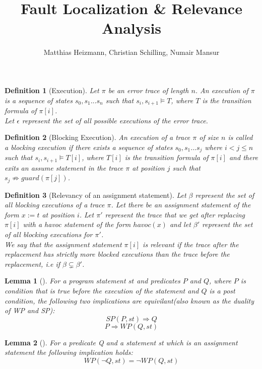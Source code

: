 \documentclass{article}
\title{Fault Localization \& Relevance Analysis \\ }
\author{Matthias Heizmann, Christian Schilling, Numair Mansur}
\newcommand{\limp}{\Rightarrow}
\newtheorem{mydef}{Definition}
\newtheorem{lemma}{Lemma}
\begin{document}
\maketitle
\begin{mydef}[Execution]\label{mydef:execution}
Let $\pi$ be an error trace of length $n$. An execution of $\pi$ is a sequence of states $s_0, s_1...s_n$ such that $s_i, s_{i+1} \models T$, where $T$ is the transition formula of $\pi[i]$. \\
Let $\epsilon$ represent the set of all possible executions of the error trace.
\end{mydef}

\begin{mydef}[Blocking Execution]\label{mydef:blockingexecution}
An execution of a trace $\pi$ of size $n$ is called a blocking execution if there exists a sequence of states $s_0, s_1...s_j$ where $i<j \leq n$ such that $s_i, s_{i+1} \models T[i]$, where $T[i]$ is the transition formula of $\pi[i]$ and there exits an assume statement in the trace $\pi$ at position $j$ such that $s_{j} \not \limp guard(\pi[j])$.
\end{mydef}

\begin{mydef}[Relevancy of an assignment statement]\label{mydef:relevancy}
Let $\beta$ represent the set of all blocking executions of a trace $\pi$. Let there be an assignment statement of the form $x:=t$ at position $i$. Let $\pi'$ represent the trace that we get after replacing $\pi[i]$ with a havoc statement of the form $havoc(x)$ and let $\beta'$ represent the set of all blocking executions for $\pi'$.\\
We say that the assignment statement $\pi[i]$ is relevant if the trace after the replacement has strictly more blocked executions than the trace before the replacement, i.e if $\beta \subsetneq \beta'$. 
\end{mydef}

\begin{lemma}[]\label{lemma:duality}
For a program statement $st$ and predicates $P$ and $Q$, where $P$ is condition that is true before the execution of the statement and $Q$ is a post condition, the following two implications are equivilant(also known as the duality of WP and SP):
$$SP(P,st) \Rightarrow Q$$
$$P \Rightarrow WP(Q,st)$$
\end{lemma}

\begin{lemma}[]\label{lemma:neg_wp_assignment}
For a predicate Q and a statement st which is an assignment statement the following implication holds:\\
$$WP(\neg Q,st) = \neg WP(Q,st)$$
\end{lemma}
\end{document}
